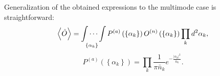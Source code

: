 Generalization of the obtained expressions to the multimode case is straightforward: 
\begin{equation}
\left<\hat{O}\right> = \idotsint\limits_{\left\{\alpha_k\right\}}
P^{(a)}
\left(
\left\{\alpha_k\right\}
\right)
O^{(n)}
\left(
\left\{\alpha_k\right\}
\right)
\prod_k d^2 \alpha_k,
\label{eqCh1_113}
\end{equation}
\[
P^{(a)}
\left(
\left\{\alpha_k\right\}
\right)
=
\prod_k \frac{1}{\pi \bar{n}_k}
e^{-\frac{\left|\alpha_k\right|^2}{\bar{n}_k}}. 
\]